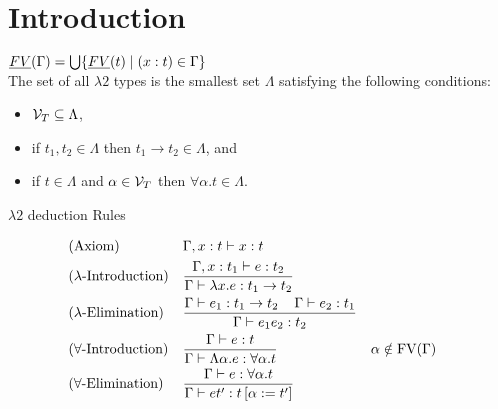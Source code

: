 \section{Introduction}
$\emph{FV}(\Gamma)=\bigcup\{\emph{FV}(t)\mid (x:t)\in \Gamma\}$\\
The set of all $\lambda2$ types \lambdaTypes{} is the smallest set $\Lambda$ satisfying the following conditions:
\begin{itemize}
\item $\mathcal{V}_T\subseteq\Lambda$,
\item if $t_1,t_2\in\Lambda$ then $t_1\to t_2\in\Lambda$, and
\item if $t\in\Lambda$ and $\alpha\in\mathcal{V}_T$ then $\forall\alpha.t\in\Lambda$.
\end{itemize}

$\lambda2$ deduction Rules
\begin{mdframed}
\begingroup
\addtolength{\jot}{0.3cm}
\begin{align*}
&(\text{Axiom}) &&\Gamma,x:t\vdash x:t\\
&(\lambda\text{-Introduction}) &&\frac{\Gamma,x:t_1\vdash e:t_2}{\Gamma\vdash \lambda x.e:t_1\to t_2}\\
&(\lambda\text{-Elimination}) &&\frac{\Gamma\vdash e_1:t_1\to t_2 \hspace{0.4cm}\Gamma\vdash e_2:t_1}{\Gamma\vdash e_1e_2:t_2}\\
&(\forall\text{-Introduction}) &&\frac{\Gamma\vdash e:t}{\Gamma\vdash \Lambda\alpha.e:\forall\alpha.t} &&\alpha\notin\text{FV}(\Gamma) \\
&(\forall\text{-Elimination}) &&\frac{\Gamma\vdash e:\forall\alpha.t }{\Gamma\vdash et':t\left[ \alpha:=t'\right] }
\end{align*}
\endgroup
\end{mdframed}
